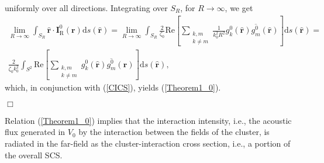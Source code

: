 \documentclass{article}
\begin{document}
%
uniformly over all directions. Integrating over $S_R$, for $R\rightarrow\infty$, we get
%
\begin{align}
\nonumber
\lim_{R\rightarrow\infty}\int_{S_R}\hat{\mathbf{r}}\cdot\mathbf{I}_{\mathrm{R}}^0(\mathbf{r})\mathrm{d}s(\hat{\mathbf{r}})=\lim_{R\rightarrow\infty}\int_{S_R}\frac{2}{\zeta_0}\mathrm{Re}\left[\sum_{\substack{k,m\\k\ne m}}\frac{1}{k_0^2R^2} g_k^{0}(\hat{\mathbf{r}})\overline{g_m^{0}}(\hat{\mathbf{r}})\right]\mathrm{d}s(\hat{\mathbf{r}})=\\\frac{2}{\zeta_0 k_0^2}\int_{S^2}\mathrm{Re}\left[\sum_{\substack{k,m\\k\ne m}}g_k^{0}(\hat{\mathbf{r}})\overline{g_m^{0}}(\hat{\mathbf{r}})\right]\mathrm{d}s(\hat{\mathbf{r}}),
\label{Theorem1_4}
\end{align}
%
which, in conjunction with (\ref{CICS}), yields (\ref{Theorem1_0}). 
\begin{flushright}$\Box$\end{flushright}

Relation (\ref{Theorem1_0}) implies that the interaction intensity, i.e., the acoustic flux generated in $V_0$ by the interaction between the fields of the cluster, is radiated in the far-field as the cluster-interaction cross section, i.e., a portion of the overall SCS.
\end{document}
